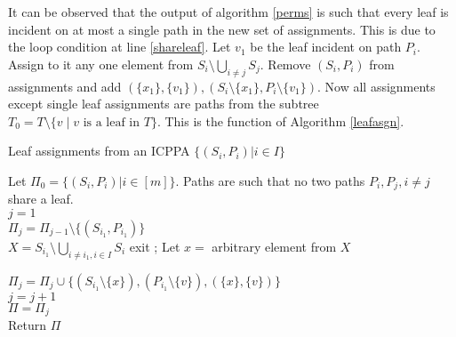 \documentclass{llncs}
\begin{document}
\noindent
It can be observed that the output of algorithm \ref{perms} is such
that every leaf is incident on at most a single path in the new set of
assignments. This is due to the loop condition at line
\ref{shareleaf}. Let $v_1$ be the leaf incident on path $P_i$. Assign
to it any one element from $S_i \setminus \bigcup_{i \ne j}
S_j$. Remove $(S_i, P_i)$ from assignments and add $(\{x_1\},
\{v_1\}), (S_i \setminus \{x_1\}, P_i \setminus \{v_1\})$. Now all
assignments except single leaf assignments are paths from the subtree
$T_0 = T \setminus \{v \mid v \text{ is a leaf in } T\}$. This is the
function of Algorithm \ref{leafasgn}.


\begin{algorithm}[h]
\caption{Leaf assignments from an ICPPA $\{(S_i,P_i) | i \in I\}$}
\label{leafasgn}
\begin{algorithmic}
\STATE Let $\Pi_0=\{(S_i,P_i)| i \in [m]\}$. Paths are such that no
two paths $P_i, P_j, i \ne j$ share a leaf.\\
\STATE $j = 1$\\
\STATE $\Pi_j=   \Pi_{j-1} \setminus \{(S_{i_1}, P_{i_1})\}$\\
\STATE $X = S_{i_1} \setminus \bigcup_{i \ne i_1, i \in
  I}S_i$
\STATE exit 
\ENDIF;
\STATE Let $x = $ arbitrary element from $X$ \vspace{2mm}

\STATE $\Pi_j = \Pi_j \cup \{(S_{i_1} \setminus \{x\}),(P_{i_1} \setminus
  \{v\}), (\{x\},\{v\})\}$\\
\STATE $j = j+1$\\
\ENDWHILE
\STATE $\Pi = \Pi_j$\\
\STATE Return $\Pi$\\
\end{algorithmic}
\end{algorithm}
\end{document}
